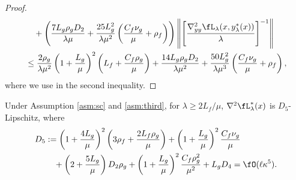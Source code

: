 \begin{proof}
{\begin{align*}
    &\quad + \left( \frac{7L_g \rho_g D_2}{\lambda \mu} + \frac{25L_g^2 }{\lambda \mu^2} \left( \frac{C_f \nu_g}{\mu} + \rho_f \right) \right) \left \Vert \left [  \frac{\nabla_{yy}^2 \fL_{\lambda}(x,y_{\lambda}^*(x))}{\lambda} \right]^{-1} \right \Vert \\
    &\le \frac{2\rho_g}{\lambda \mu^2}  \left( 1 + \frac{L_g}{\mu}\right)^2  \left(L_f + 
     \frac{C_f \rho_g}{\mu}
     \right) +   \frac{14 L_g \rho_g D_2}{\lambda \mu^2} + \frac{50 L_g^2 }{\lambda \mu^3} \left( \frac{C_f \nu_g}{\mu} + \rho_f \right) ,
\end{align*}}
where we use  in the second inequality.
\end{proof}

\begin{lem} \label{lem:nabla3-bound}
Under Assumption \ref{asm:sc} and \ref{asm:third}, for $ \lambda \ge 2 L_f /\mu$, 
$\nabla^2 \fL_{\lambda}^*(x) $ is $D_5$-Lipschitz,
 where
\begin{align*}
    D_5 &:=  \left( 1 + \frac{4L_g}{\mu} \right)^2 \left( 3\rho_f  + \frac{2 L_f \rho_g}{\mu} \right) + \left(1 + \frac{L_g}{\mu} \right)^2 \frac{C_f \nu_g}{\mu} \\
    &\quad + \left(2+ \frac{5L_g}{\mu} \right) D_2 \rho_g +  \left( 1+ \frac{L_g}{\mu} \right)^2 \frac{C_f \rho_g^2}{\mu^2} + L_g D_4   = \fO(\ell \kappa^5).
\end{align*}
\end{lem}


